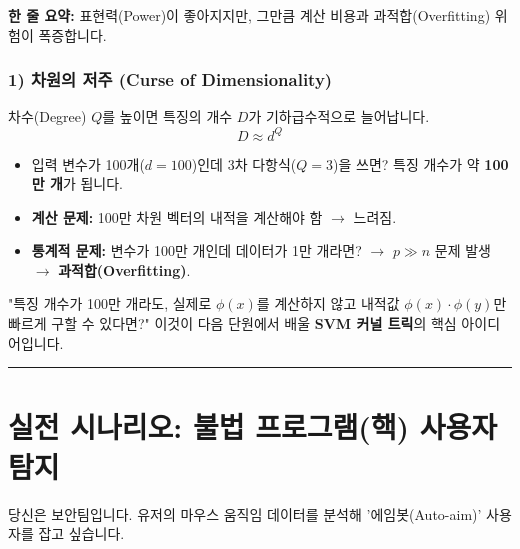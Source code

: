 \documentclass[11pt,a4paper]{book}
\theoremstyle{definition}
\begin{document}
\begin{conceptbox}[title={개념 4: 공짜 점심은 없다}]
\textbf{한 줄 요약:} 표현력(Power)이 좋아지지만, 그만큼 계산 비용과 과적합(Overfitting) 위험이 폭증합니다.
\end{conceptbox}

\subsubsection*{1) 차원의 저주 (Curse of Dimensionality)}
차수(Degree) $Q$를 높이면 특징의 개수 $D$가 기하급수적으로 늘어납니다.
$$ D \approx d^Q $$
\begin{itemize}
    \item 입력 변수가 100개($d=100$)인데 3차 다항식($Q=3$)을 쓰면? 특징 개수가 약 \textbf{100만 개}가 됩니다.
    \item \textbf{계산 문제:} 100만 차원 벡터의 내적을 계산해야 함 $\rightarrow$ 느려짐.
    \item \textbf{통계적 문제:} 변수가 100만 개인데 데이터가 1만 개라면? $\rightarrow$ $p \gg n$ 문제 발생 $\rightarrow$ \textbf{과적합(Overfitting)}.
\end{itemize}

\begin{warningbox}[title={커널 트릭 (Kernel Trick) 예고}]
"특징 개수가 100만 개라도, 실제로 $\phi(x)$를 계산하지 않고 내적값 $\phi(x) \cdot \phi(y)$만 빠르게 구할 수 있다면?"
이것이 다음 단원에서 배울 \textbf{SVM 커널 트릭}의 핵심 아이디어입니다.
\end{warningbox}

\vspace{0.5cm}\hrule\vspace{0.5cm}

\section{실전 시나리오: 불법 프로그램(핵) 사용자 탐지}

\begin{storybox}[title={Scenario: 넥슨 FPS 게임 '서든어택'의 에임봇 탐지}]
당신은 보안팀입니다. 유저의 마우스 움직임 데이터를 분석해 '에임봇(Auto-aim)' 사용자를 잡고 싶습니다.
\end{storybox}
\end{document}
